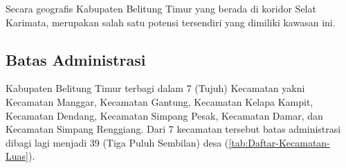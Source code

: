 Secara geografis Kabupaten Belitung Timur yang berada di koridor Selat
Karimata, merupakan salah satu potensi tersendiri yang dimiliki kawasan
ini.

\subsection{Batas Administrasi}

Kabupaten Belitung Timur terbagi dalam 7 (Tujuh) Kecamatan yakni
Kecamatan Manggar, Kecamatan Gantung, Kecamatan Kelapa Kampit, Kecamatan
Dendang, Kecamatan Simpang Pesak, Kecamatan Damar, dan Kecamatan Simpang
Renggiang. Dari 7 kecamatan tersebut batas administrasi dibagi lagi menjadi 39 (Tiga Puluh Sembilan) desa (\autoref{tab:Daftar-Kecamatan-Luas}).

\newpage


